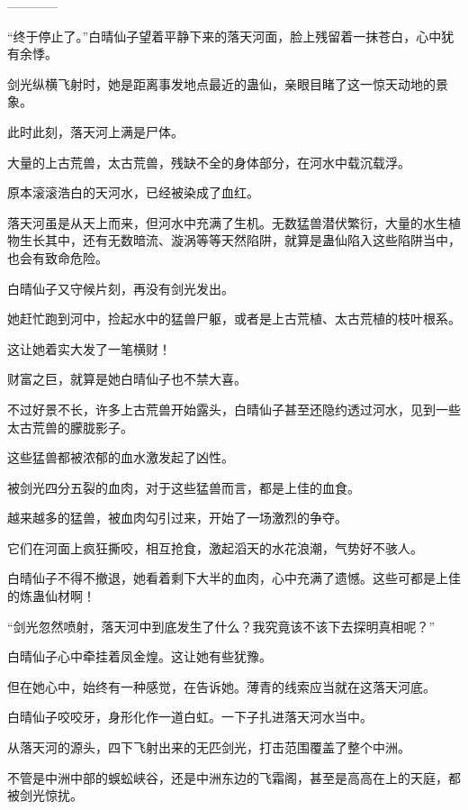
\begin{this_body}

------------

“终于停止了。”白晴仙子望着平静下来的落天河面，脸上残留着一抹苍白，心中犹有余悸。

剑光纵横飞射时，她是距离事发地点最近的蛊仙，亲眼目睹了这一惊天动地的景象。

此时此刻，落天河上满是尸体。

大量的上古荒兽，太古荒兽，残缺不全的身体部分，在河水中载沉载浮。

原本滚滚浩白的天河水，已经被染成了血红。

落天河虽是从天上而来，但河水中充满了生机。无数猛兽潜伏繁衍，大量的水生植物生长其中，还有无数暗流、漩涡等等天然陷阱，就算是蛊仙陷入这些陷阱当中，也会有致命危险。

白晴仙子又守候片刻，再没有剑光发出。

她赶忙跑到河中，捡起水中的猛兽尸躯，或者是上古荒植、太古荒植的枝叶根系。

这让她着实大发了一笔横财！

财富之巨，就算是她白晴仙子也不禁大喜。

不过好景不长，许多上古荒兽开始露头，白晴仙子甚至还隐约透过河水，见到一些太古荒兽的朦胧影子。

这些猛兽都被浓郁的血水激发起了凶性。

被剑光四分五裂的血肉，对于这些猛兽而言，都是上佳的血食。

越来越多的猛兽，被血肉勾引过来，开始了一场激烈的争夺。

它们在河面上疯狂撕咬，相互抢食，激起滔天的水花浪潮，气势好不骇人。

白晴仙子不得不撤退，她看着剩下大半的血肉，心中充满了遗憾。这些可都是上佳的炼蛊仙材啊！

“剑光忽然喷射，落天河中到底发生了什么？我究竟该不该下去探明真相呢？”

白晴仙子心中牵挂着凤金煌。这让她有些犹豫。

但在她心中，始终有一种感觉，在告诉她。薄青的线索应当就在这落天河底。

白晴仙子咬咬牙，身形化作一道白虹。一下子扎进落天河水当中。

从落天河的源头，四下飞射出来的无匹剑光，打击范围覆盖了整个中洲。

不管是中洲中部的蜈蚣峡谷，还是中洲东边的飞霜阁，甚至是高高在上的天庭，都被剑光惊扰。


\end{this_body}
